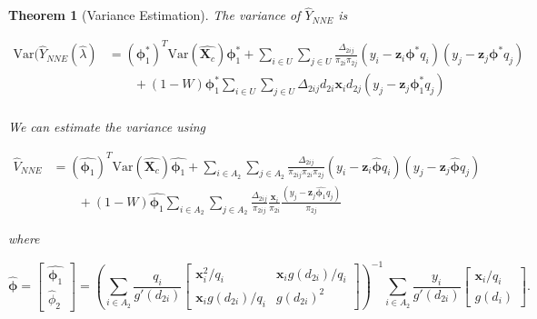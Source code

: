 \documentclass[12pt]{article}
\newtheorem{theorem}{Theorem}
\newcommand{\Var}{{\text{Var}}}
\renewcommand{\bf}[1]{\mathbf{#1}}
\begin{document}
\begin{theorem}[Variance Estimation]
  The variance of $\hat Y_{NNE}$ is 

  \begin{align*}
    \Var(\hat Y_{NNE}(\hat \lambda)
    &= (\bm \phi_1^*)^T \Var(\hat{\bf X_c}) \bm \phi_1^* + 
    \sum_{i \in U} \sum_{j \in U} \frac{\Delta_{2ij}}{\pi_{2i}\pi_{2j}} 
      (y_i - \bf z_i \bm \phi^* q_i)(y_j - \bf z_j \bm \phi^* q_j)\\
    &\qquad + (1 - W)\bm \phi_1^* \sum_{i \in U} \sum_{j \in U} \Delta_{2ij}
    d_{2i} \bf x_i d_{2j}(y_j - \bf z_j \bm \phi^*_1 q_j)\\
  \end{align*}

  We can estimate the variance using

  \begin{align*}
    \hat V_{NNE} 
    &= (\hat{\bm \phi_1})^T \Var(\hat{\bf X_c}) \hat{\bm \phi_1} + 
    \sum_{i \in A_2} \sum_{j \in A_2} \frac{\Delta_{2ij}}{\pi_{2ij}\pi_{2i}\pi_{2j}} 
    (y_i - \bf z_i \hat{\bm \phi} q_i)(y_j - \bf z_j \hat{\bm \phi} q_j) \\
    &\qquad + (1 - W)\hat{\bm \phi_1} \sum_{i \in A_2} \sum_{j \in A_2} \frac{\Delta_{2ij}}{\pi_{2ij}}
    \frac{\bf x_i}{\pi_{2i}} \frac{(y_j - \bf z_j \hat{\bm \phi_1} q_j)}{\pi_{2j}}
  \end{align*}

  where 
  
  $$\hat{\bm \phi} =
  \begin{bmatrix}
    \hat{\bm \phi_1} \\ \hat \phi_2
  \end{bmatrix} = 
  \left(\sum_{i \in A_2} \frac{q_i}{g'(d_{2i})} 
  \begin{bmatrix}
    \bf x_i^2 / q_i & \bf x_i g(d_{2i}) / q_i \\
    \bf x_i g(d_{2i}) / q_i & g(d_{2i})^2
  \end{bmatrix}
  \right)^{-1}
  \sum_{i \in A_2} \frac{y_i}{g'(d_{2i})} 
  \begin{bmatrix} \bf x_i / q_i \\ g(d_i) \end{bmatrix}.
  $$
\end{theorem}
\end{document}
